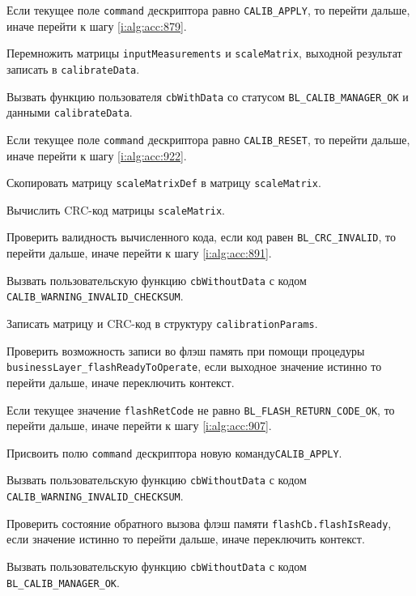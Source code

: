 \begin{enumerate_step}
    \item \label{i:alg:acc:866} Если текущее поле \lstinline|command| дескриптора равно \lstinline|CALIB_APPLY|, то перейти дальше, иначе перейти к шагу
    \ref{i:alg:acc:879}.
    \item Перемножить матрицы \lstinline|inputMeasurements| и \lstinline|scaleMatrix|, выходной результат записать в \lstinline|calibrateData|.
    \item Вызвать функцию пользователя \lstinline|cbWithData| со статусом \lstinline|BL_CALIB_MANAGER_OK| и данными \lstinline|calibrateData|.
    \item \label{i:alg:acc:879} Если текущее поле \lstinline|command| дескриптора равно \lstinline|CALIB_RESET|, то перейти дальше, иначе перейти к шагу
    \ref{i:alg:acc:922}.
    \item Скопировать матрицу \lstinline|scaleMatrixDef| в матрицу \lstinline|scaleMatrix|.
    \item Вычислить CRC-код матрицы \lstinline|scaleMatrix|.
    \item Проверить валидность вычисленного кода, если код равен \lstinline|BL_CRC_INVALID|, то перейти дальше, иначе перейти к шагу \ref{i:alg:acc:891}.
    \item Вызвать пользовательскую функцию \lstinline|cbWithoutData| с кодом \lstinline|CALIB_WARNING_INVALID_CHECKSUM|.
    \item \label{i:alg:acc:891} Записать матрицу и CRC-код в структуру \lstinline|calibrationParams|.
    \item Проверить возможность записи во флэш память при помощи процедуры \lstinline|businessLayer_flashReadyToOperate|, если выходное значение истинно то перейти дальше, иначе переключить контекст.
    \item Если текущее значение \lstinline|flashRetCode| не равно \lstinline|BL_FLASH_RETURN_CODE_OK|, то перейти дальше, иначе перейти к шагу
    \ref{i:alg:acc:907}.
    \item Присвоить полю \lstinline|command| дескриптора  новую команду\lstinline|CALIB_APPLY|.
    \item \label{i:alg:acc:903} Вызвать пользовательскую функцию \lstinline|cbWithoutData| с кодом \lstinline|CALIB_WARNING_INVALID_CHECKSUM|.
    \item \label{i:alg:acc:907} Проверить состояние обратного вызова флэш памяти \lstinline|flashCb.flashIsReady|, если значение истинно то перейти дальше, иначе переключить контекст.
    \item Вызвать пользовательскую функцию \lstinline|cbWithoutData| с кодом \lstinline|BL_CALIB_MANAGER_OK|.
    

\end{enumerate_step}
